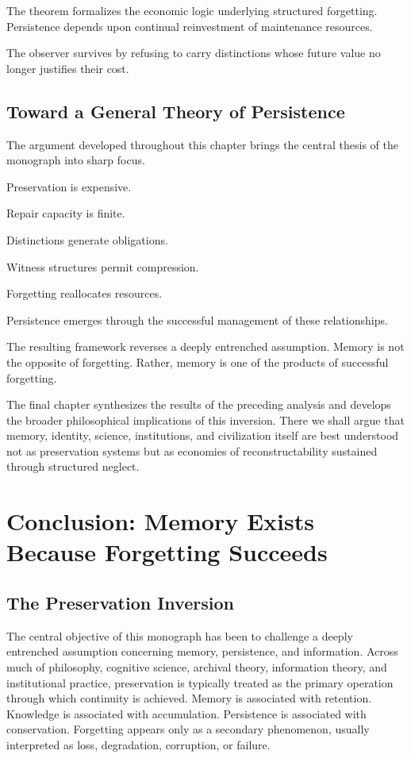 \documentclass[12pt,oneside]{book}
\theoremstyle{plain} \newtheorem{theorem}{Theorem}[chapter] \newtheorem{lemma}[theorem]{Lemma} \newtheorem{proposition}[theorem]{Proposition} \newtheorem{corollary}[theorem]{Corollary}
\theoremstyle{definition} \newtheorem{definition}[theorem]{Definition} \newtheorem{axiom}[theorem]{Axiom} \newtheorem{construction}[theorem]{Construction}
\theoremstyle{remark} \newtheorem{remark}[theorem]{Remark} \newtheorem{example}[theorem]{Example}
\begin{document}
The theorem formalizes the economic logic underlying structured forgetting. Persistence depends upon continual reinvestment of maintenance resources.

The observer survives by refusing to carry distinctions whose future value no longer justifies their cost.

\section{Toward a General Theory of Persistence}

The argument developed throughout this chapter brings the central thesis of the monograph into sharp focus.

Preservation is expensive.

Repair capacity is finite.

Distinctions generate obligations.

Witness structures permit compression.

Forgetting reallocates resources.

Persistence emerges through the successful management of these relationships.

The resulting framework reverses a deeply entrenched assumption. Memory is not the opposite of forgetting. Rather, memory is one of the products of successful forgetting.

The final chapter synthesizes the results of the preceding analysis and develops the broader philosophical implications of this inversion. There we shall argue that memory, identity, science, institutions, and civilization itself are best understood not as preservation systems but as economies of reconstructability sustained through structured neglect.

\chapter{Conclusion: Memory Exists Because Forgetting Succeeds}

\section{The Preservation Inversion}

The central objective of this monograph has been to challenge a deeply entrenched assumption concerning memory, persistence, and information. Across much of philosophy, cognitive science, archival theory, information theory, and institutional practice, preservation is typically treated as the primary operation through which continuity is achieved. Memory is associated with retention. Knowledge is associated with accumulation. Persistence is associated with conservation. Forgetting appears only as a secondary phenomenon, usually interpreted as loss, degradation, corruption, or failure.
\end{document}
